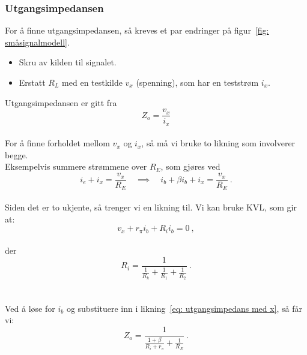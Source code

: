 \documentclass[a4paper,11pt,norsk]{article}
\begin{document}
\newpage

\subsubsection{Utgangsimpedansen}
\label{subsec: utgangsimpedans}
For å finne utgangsimpedansen, så kreves et par endringer på figur~\ref{fig: småsignalmodell}.
\begin{itemize}
    \item Skru av kilden til signalet.
    \item Erstatt $R_L$ med en testkilde $v_x$ (spenning), som har en teststrøm $i_x$.
\end{itemize}
Utgangsimpedansen er gitt fra
\begin{equation} \label{eq: Z_o first}
    Z_o = \frac{v_x}{i_x}
\end{equation}\\
For å finne forholdet mellom $v_x$ og $i_x$, så må vi bruke to likning som involverer begge. \\Eksempelvis summere strømmene over $R_E$, som gjøres ved
\begin{equation}\label{eq: utgangsimpedans med x}
    i_e + i_x = \frac{v_x}{R_E} \quad \implies \quad i_b + \beta i_b + i_x = \frac{v_x}{R_E} \: .
\end{equation}\\
Siden det er to ukjente, så trenger vi en likning til. Vi kan bruke KVL, som gir at:
\begin{equation} \label{eq: utgangsimpedans 2 med x}
    v_x + r_\pi i_b + R_i i_b = 0 \:,
\end{equation}\\
der
\begin{equation} \label{eq: R_i}
    R_i = \frac{1}{\frac{1}{R_k} + \frac{1}{R_1} + \frac{1}{R_2}} \: .
\end{equation}
\\\\
Ved å løse for $i_b$ og substituere inn i likning~\ref{eq: utgangsimpedans med x}, så får vi:
\begin{equation} \label{eq: Z_o final}
    Z_o = \frac{1}{\frac{1+\beta}{R_i+r_\pi} + \frac{1}{R_E}} \: .
\end{equation}

\newpage

\newpage
\end{document}
